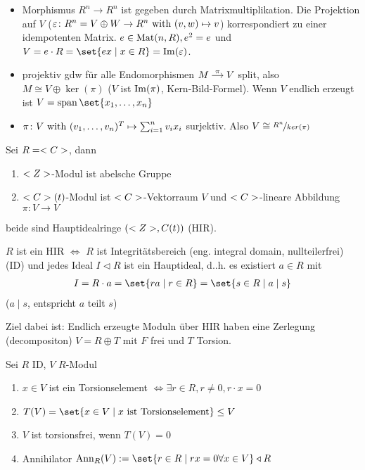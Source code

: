 \begin{erinnerung}
	\begin{itemize}
		\item Morphismus $R^n \to R^n$ ist gegeben durch Matrixmultiplikation. Die Projektion auf $V$ ($\varepsilon \colon R^n = V \oplus W \to R^n \text{ with } (v,w) \mapsto v$) korrespondiert zu einer idempotenten Matrix. $e \in \operatorname{Mat}(n,R), e^2 = e$ und $V = e\cdot R = \set{e x \mid x \in R} = \Image(\epsilon)$. 
		\item projektiv gdw für alle Endomorphismen $\begin{tikzcd}[cramped, sep=small]
		M \arrow[r, "\pi"] & V
		\end{tikzcd}$ split, also $M \cong V \oplus \ker(\pi)$ ($V$ ist $\operatorname{Im}(\pi)$, Kern-Bild-Formel). Wenn $V$ endlich erzeugt ist $V = \Span\set{x_1, \dots, x_n}$
		\item $\pi \colon V \text{ with } (v_1, \dots, v_n)^T \mapsto \sum_{i=1}^n v_i x_i$ surjektiv. Also $V \cong \lnkset{R^n}{ker(\pi)}$
	\end{itemize}
\end{erinnerung}
\begin{example}
	Sei $R = <C>$, dann
	\begin{enumerate}
		\item $<Z>$-Modul ist abelsche Gruppe
		\item $<C>(t)$-Modul ist $<C>$-Vektorraum $V$ und $<C>$-lineare Abbildung $\pi\colon V \to V$
	\end{enumerate}
	beide sind Hauptidealringe $(<Z>, C(t))$ (HIR).
\end{example}
\begin{definition}
	$R$ ist ein HIR $\Leftrightarrow$ $R$ ist Integritätsbereich (eng. integral domain, nullteilerfrei) (ID) und jedes Ideal $I \lhd R$ ist ein Hauptideal, d..h. es existiert $a \in R$ mit
	\begin{align*}
		I = R \cdot a = \set{ra \mid r \in R} = \set{s \in R \mid a \mid s}
	\end{align*}
	($a \mid s$, entspricht $a$ teilt $s$)
\end{definition}
Ziel dabei ist: Endlich erzeugte Moduln über HIR haben eine Zerlegung (decompositon) $V = R \oplus T$ mit $F$ frei und $T$ Torsion.
\begin{definition}
	Sei $R$ ID, $V$ $R$-Modul
	\begin{enumerate}
		\item $x \in V$ ist ein Torsionselement $\Leftrightarrow \exists r \in R, r \neq 0, r\cdot x = 0$
		\item $T(V) = \set{x \in V \mid x \text{ ist Torsionselement}} \le V$
		\item $V$ ist torsionsfrei, wenn $T(V) = 0$
		\item Annihilator $\Ann_R (V) := \set{r \in R \mid rx = 0 \forall x \in V} \lhd R$
	\end{enumerate}
\end{definition}
